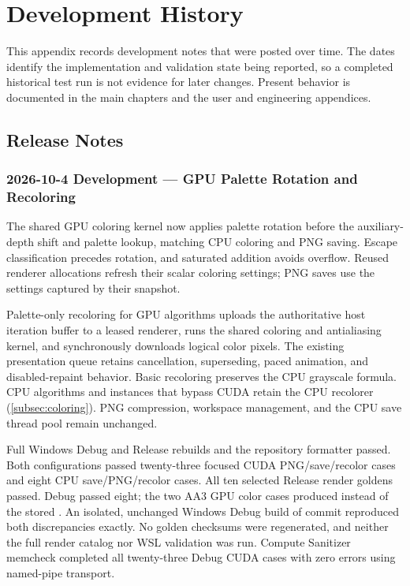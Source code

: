 \section{Development History}
\label{sec:development-history}

This appendix records development notes that were posted over time. The dates
identify the implementation and validation state being reported, so a completed
historical test run is not evidence for later changes. Present behavior is
documented in the main chapters and the user and engineering appendices.

\subsection{Release Notes}

\subsubsection{2026-10-4 Development --- GPU Palette Rotation and Recoloring}

The shared GPU coloring kernel now applies palette rotation before the
auxiliary-depth shift and palette lookup, matching CPU coloring and PNG
saving. Escape classification precedes rotation, and saturated addition
avoids overflow. Reused renderer allocations refresh their scalar coloring
settings; PNG saves use the settings captured by their snapshot.

Palette-only recoloring for GPU algorithms uploads the authoritative host
iteration buffer to a leased renderer, runs the shared coloring and
antialiasing kernel, and synchronously downloads logical color pixels.
The existing presentation queue retains cancellation, superseding, paced
animation, and disabled-repaint behavior. Basic recoloring preserves the
CPU grayscale formula. CPU algorithms and instances that bypass CUDA retain
the CPU recolorer (\cref{subsec:coloring}). PNG compression, workspace
management, and the CPU save thread pool remain unchanged.

Full Windows Debug and Release rebuilds and the repository formatter passed.
Both configurations passed twenty-three focused CUDA PNG/save/recolor cases
and eight CPU save/PNG/recolor cases. All ten selected Release render goldens
passed. Debug passed eight; the two AA3 GPU color cases produced
 instead of the stored .
An isolated, unchanged Windows Debug build of commit 
reproduced both discrepancies exactly. No golden checksums were regenerated,
and neither the full render catalog nor WSL validation was run.
Compute Sanitizer memcheck completed all twenty-three Debug CUDA cases with
zero errors using named-pipe transport.

